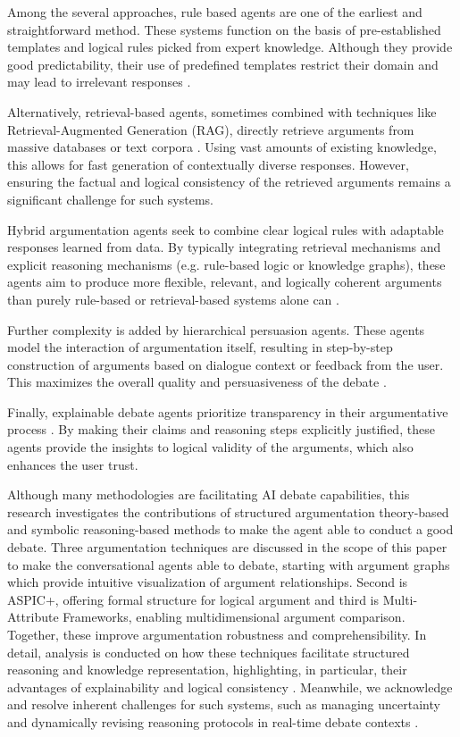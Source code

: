 \documentclass[conference]{IEEEtran}
\begin{document}
Among the several approaches, rule based agents are one of the earliest and straightforward method. These systems function on the basis of pre-established templates and logical rules picked from expert knowledge. Although they provide good predictability, their use of predefined templates restrict their domain and may lead to irrelevant responses \cite{montealto2021rulebased}.

Alternatively, retrieval-based agents, sometimes combined with techniques like Retrieval-Augmented Generation (RAG), directly retrieve arguments from massive databases or text corpora \cite{kulatska2019arguebot}. Using vast amounts of existing knowledge, this allows for fast generation of contextually diverse responses. However, ensuring the factual and logical consistency of the retrieved arguments remains a significant challenge for such systems.

Hybrid argumentation agents seek to combine clear logical rules with adaptable responses learned from data. By typically integrating retrieval mechanisms and explicit reasoning mechanisms (e.g. rule-based logic or knowledge graphs), these agents aim to produce more flexible, relevant, and logically coherent arguments than purely rule-based or retrieval-based systems alone can \cite{kulatska2019arguebot}.

Further complexity is added by hierarchical persuasion agents. These agents model the interaction of argumentation itself, resulting in step-by-step construction of arguments based on dialogue context or feedback from the user. This maximizes the overall quality and persuasiveness of the debate \cite{sakai2020hierarchical}.

Finally, explainable debate agents prioritize transparency in their argumentative process \cite{ali2022supportattack}. By making their claims and reasoning steps explicitly justified, these agents provide the insights to logical validity of the arguments, which also enhances the user trust.

Although many methodologies are facilitating AI debate capabilities, this research investigates the contributions of structured argumentation theory-based and symbolic reasoning-based methods to make the agent able to conduct a good debate. Three argumentation techniques are discussed in the scope of this paper to make the conversational agents able to debate, starting with argument graphs which provide intuitive visualization of argument relationships. Second is ASPIC+, offering formal structure for logical argument and third is Multi-Attribute Frameworks, enabling multidimensional argument comparison. Together, these improve argumentation robustness and comprehensibility. In detail, analysis is conducted on how these techniques facilitate structured reasoning and knowledge representation, highlighting, in particular, their advantages of explainability and logical consistency \cite{kasif2024trilogy}. Meanwhile, we acknowledge and resolve inherent challenges for such systems, such as managing uncertainty and dynamically revising reasoning protocols in real-time debate contexts \cite{kasif2024trilogy}.
\end{document}
